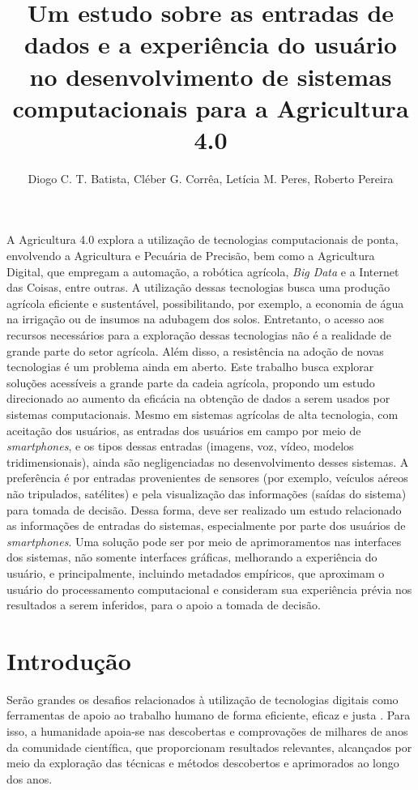 \documentclass[12pt]{article}
\title{Um estudo sobre as entradas de dados e a experiência do usuário no desenvolvimento de sistemas computacionais para a Agricultura 4.0}
\author{Diogo C. T. Batista\inst{1}, Cléber G. Corrêa\inst{1}, Letícia M. Peres\inst{2}, Roberto Pereira\inst{2}}
\begin{document}
 

\maketitle
     
\begin{resumo} 
A Agricultura 4.0 explora a utilização de tecnologias computacionais de ponta, envolvendo a Agricultura e Pecuária de Precisão, bem como a Agricultura Digital, que empregam a automação, a robótica agrícola, \textit{Big Data} e a Internet das Coisas, entre outras. A utilização dessas tecnologias busca uma produção agrícola eficiente e sustentável, possibilitando, por exemplo, a economia de água na irrigação ou de insumos na adubagem dos solos. Entretanto, o acesso aos recursos necessários para a exploração dessas tecnologias não é a realidade de grande parte do setor agrícola. Além disso, a resistência na adoção de novas tecnologias é um problema ainda em aberto. Este trabalho busca explorar soluções acessíveis a grande parte da cadeia agrícola, propondo um estudo direcionado ao aumento da eficácia na obtenção de dados a serem usados por sistemas computacionais. Mesmo em sistemas agrícolas de alta tecnologia, com aceitação dos usuários, as entradas dos usuários em campo por meio de \textit{smartphones}, e os tipos dessas entradas (imagens, voz, vídeo, modelos tridimensionais), ainda são negligenciadas no desenvolvimento desses sistemas. A preferência é por entradas provenientes de sensores (por exemplo, veículos aéreos não tripulados, satélites) e pela visualização das informações (saídas do sistema) para tomada de decisão. Dessa forma, deve ser realizado um estudo relacionado as informações de entradas do sistemas, especialmente por parte dos usuários de \textit{smartphones}. Uma solução pode ser por meio de aprimoramentos nas interfaces dos sistemas, não somente interfaces gráficas, melhorando a experiência do usuário, e principalmente, incluindo metadados empíricos, que aproximam o usuário do processamento computacional e consideram sua experiência prévia nos resultados a serem inferidos, para o apoio a tomada de decisão.
\end{resumo}

\section{Introdução}
\label{sec:introducao}

Serão grandes os desafios relacionados à utilização de tecnologias digitais como ferramentas de apoio ao trabalho humano de forma eficiente, eficaz e justa \cite{Rose:2019}. Para isso, a humanidade apoia-se nas descobertas e comprovações de milhares de anos da comunidade científica, que proporcionam resultados relevantes, alcançados por meio da exploração das técnicas e métodos descobertos e aprimorados ao longo dos anos.
\end{document}
